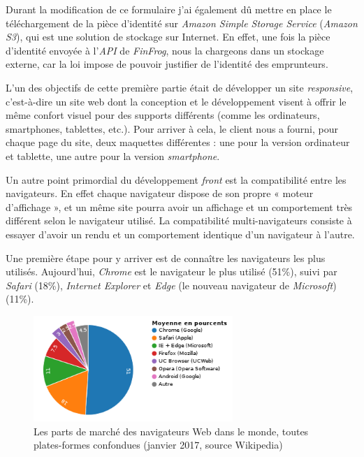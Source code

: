 \bigskip

Durant la modification de ce formulaire j'ai également dû mettre en
place le téléchargement de la pièce d'identité sur \emph{Amazon Simple
Storage Service} (\emph{Amazon S3}), qui est une solution de stockage
sur Internet. En effet, une fois la pièce d'identité envoyée à
l'\emph{API} de \emph{FinFrog}, nous la chargeons dans un stockage
externe, car la loi impose de pouvoir justifier de l'identité des
emprunteurs.

\bigskip

L'un des objectifs de cette première partie était de développer un site
\emph{responsive}, c'est-à-dire un site web dont la conception et le
développement visent à offrir le même confort visuel pour des supports
différents (comme les ordinateurs, smartphones, tablettes, etc.). Pour
arriver à cela, le client nous a fourni, pour chaque page du site, deux
maquettes différentes : une pour la version ordinateur et tablette, une
autre pour la version \emph{smartphone}.

\bigskip

Un autre point primordial du développement \emph{front} est la
compatibilité entre les navigateurs. En effet chaque navigateur dispose
de son propre « moteur d'affichage », et un même site pourra avoir un
affichage et un comportement très différent selon le navigateur utilisé.
La compatibilité multi-navigateurs consiste à essayer d'avoir un rendu
et un comportement identique d'un navigateur à l'autre.

\bigskip

Une première étape pour y arriver est de connaître les navigateurs les
plus utilisés. Aujourd'hui, \emph{Chrome} est le navigateur le plus
utilisé (51\%), suivi par \emph{Safari} (18\%), \emph{Internet Explorer}
et \emph{Edge} (le nouveau navigateur de \emph{Microsoft}) (11\%).

\begin{figure}[h]
  \centering
  \includegraphics[height=4cm]{figures/browsers.png}
  \caption{Les parts de marché des navigateurs Web dans le monde, toutes plates-formes confondues (janvier 2017, source Wikipedia)}
\end{figure}

